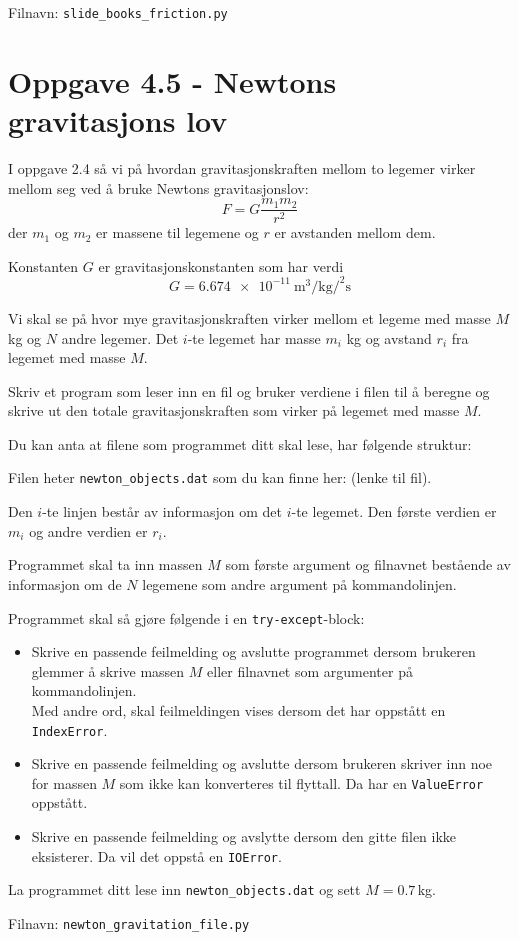 \documentclass[10pt,a4paper]{article}
\begin{document}
Filnavn: \texttt{slide\_books\_friction.py}
 
\section*{Oppgave 4.5 - Newtons gravitasjons lov}
I oppgave 2.4 så vi på hvordan gravitasjonskraften mellom to legemer virker mellom seg ved å bruke Newtons gravitasjonslov:
	\begin{equation*}
	F = G\frac{m_1m_2}{r^2}
	\end{equation*}
der $m_1$ og $m_2$ er massene til legemene og $r$ er avstanden mellom dem.
 
Konstanten $G$ er gravitasjonskonstanten som har verdi
\[
G = \SI{6.674e-11}{\cubic\meter\per\kilogram\per\squared\second}
\]
 
Vi skal se på hvor mye gravitasjonskraften virker mellom et legeme med masse $M$ kg og $N$ andre legemer. Det $i$-te legemet har masse $m_i$ kg og avstand $r_i$ fra legemet med masse $M$.
 
Skriv et program som leser inn en fil og bruker verdiene i filen til å beregne og skrive ut den totale gravitasjonskraften som virker på legemet med masse $M$. 
 
Du kan anta at filene som programmet ditt skal lese, har følgende struktur:

Filen heter \texttt{newton\_objects.dat} som du kan finne her: (lenke til fil).
 
Den $i$-te linjen består av informasjon om det $i$-te legemet. Den  første verdien er $m_i$ og andre verdien er $r_i$.
 
Programmet skal ta inn massen $M$ som første argument og filnavnet bestående av informasjon om de $N$ legemene som andre argument på kommandolinjen.
 
 Programmet skal så gjøre følgende i en  \texttt{try-except}-block:
\begin{itemize}
\item Skrive en passende feilmelding og avslutte programmet dersom brukeren glemmer å skrive massen $M$ eller filnavnet som argumenter på kommandolinjen.\\
Med andre ord, skal feilmeldingen vises dersom det har oppstått en \texttt{IndexError}.
\item Skrive en passende feilmelding og avslutte dersom brukeren skriver inn noe for massen $M$ som ikke kan konverteres til flyttall. Da har en \texttt{ValueError} oppstått. 
\item  Skrive en passende feilmelding og avslytte dersom den gitte filen ikke eksisterer. Da vil det oppstå en \texttt{IOError}. 
\end{itemize}
 
La programmet ditt lese inn \texttt{newton\_objects.dat} og sett $M = 0.7\,$kg. 
 
Filnavn: \texttt{newton\_gravitation\_file.py}
\end{document}
